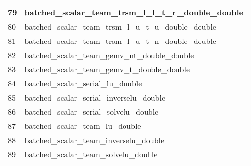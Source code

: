 \begin{table}[!htbp]
{\begin{tabular}{|>{\columncolor[HTML]{34FF34}}l |l|}
            \cellcolor[HTML]{D1B3FF}79 & batched\_scalar\_team\_trsm\_l\_l\_t\_n\_double\_double             \\ \hline
            80                         & batched\_scalar\_team\_trsm\_l\_u\_t\_u\_double\_double             \\ \hline
            \cellcolor[HTML]{D1B3FF}81 & batched\_scalar\_team\_trsm\_l\_u\_t\_n\_double\_double             \\ \hline
            82                         & batched\_scalar\_team\_gemv\_nt\_double\_double                     \\ \hline
            83                         & batched\_scalar\_team\_gemv\_t\_double\_double                      \\ \hline
            \cellcolor[HTML]{D1B3FF}84 & batched\_scalar\_serial\_lu\_double                                 \\ \hline
            \cellcolor[HTML]{D1B3FF}85 & batched\_scalar\_serial\_inverselu\_double                          \\ \hline
            86                         & batched\_scalar\_serial\_solvelu\_double                            \\ \hline
            \cellcolor[HTML]{D1B3FF}87 & batched\_scalar\_team\_lu\_double                                   \\ \hline
            \cellcolor[HTML]{D1B3FF}88 & batched\_scalar\_team\_inverselu\_double                            \\ \hline
            89                         & batched\_scalar\_team\_solvelu\_double                              \\ \hline
         \end{tabular}}
      \label{tab:kokkos_tests}
   \end{table}


